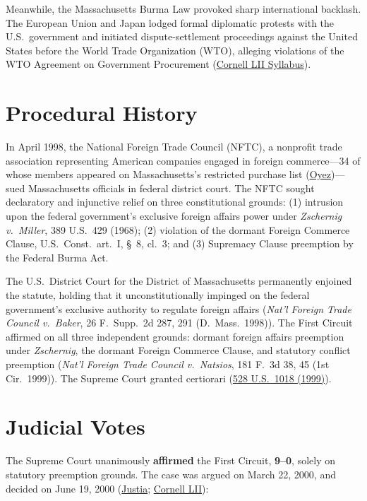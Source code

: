 \documentclass[12pt]{article}
\begin{document}
Meanwhile, the Massachusetts Burma Law provoked sharp international backlash. The European Union and Japan lodged formal diplomatic protests with the U.S.\ government and initiated dispute-settlement proceedings against the United States before the World Trade Organization (WTO), alleging violations of the WTO Agreement on Government Procurement (\href{https://www.law.cornell.edu/supct/html/99-474.ZS.html}{Cornell LII Syllabus}).

\section{Procedural History}
In April 1998, the National Foreign Trade Council (NFTC), a nonprofit trade association representing American companies engaged in foreign commerce---34 of whose members appeared on Massachusetts's restricted purchase list (\href{https://www.oyez.org/cases/1999/99-474}{Oyez})---sued Massachusetts officials in federal district court. The NFTC sought declaratory and injunctive relief on three constitutional grounds: (1) intrusion upon the federal government's exclusive foreign affairs power under \textit{Zschernig v.\ Miller}, 389 U.S.\ 429 (1968); (2) violation of the dormant Foreign Commerce Clause, U.S.\ Const.\ art.\ I, \S~8, cl.\ 3; and (3) Supremacy Clause preemption by the Federal Burma Act.

The U.S.\ District Court for the District of Massachusetts permanently enjoined the statute, holding that it unconstitutionally impinged on the federal government's exclusive authority to regulate foreign affairs (\textit{Nat'l Foreign Trade Council v.\ Baker}, 26 F.\ Supp.\ 2d 287, 291 (D.\ Mass.\ 1998)). The First Circuit affirmed on all three independent grounds: dormant foreign affairs preemption under \textit{Zschernig}, the dormant Foreign Commerce Clause, and statutory conflict preemption (\textit{Nat'l Foreign Trade Council v.\ Natsios}, 181 F.\ 3d 38, 45 (1st Cir.\ 1999)). The Supreme Court granted certiorari (\href{https://caselaw.findlaw.com/court/us-supreme-court/530/363.html}{528 U.S.\ 1018 (1999)}).

\section{Judicial Votes}
The Supreme Court unanimously \textbf{affirmed} the First Circuit, \textbf{9--0}, solely on statutory preemption grounds. The case was argued on March 22, 2000, and decided on June 19, 2000 (\href{https://supreme.justia.com/cases/federal/us/530/363/}{Justia}; \href{https://www.law.cornell.edu/supct/html/99-474.ZO.html}{Cornell LII}):
\end{document}
